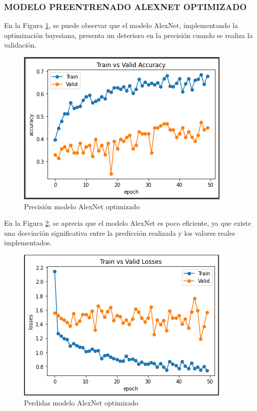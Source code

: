 	\subsubsection{\MakeUppercase{Modelo preentrenado AlexNet optimizado}}
	En la Figura \ref{fig:preci_Alex_OPT}, se puede observar que el modelo AlexNet, implementando la optimización bayesiana, presenta un deterioro en la precisión cuando se realiza la validación.
		\begin{figure}[ht]
			\centering
			\includegraphics[scale=0.6]{Figs/500.png}
			\caption{Precisión modelo AlexNet optimizado}
			\label{fig:preci_Alex_OPT}
		\end{figure}
	
	En la Figura \ref{fig:perdda_Alex_opt}, se aprecia que el modelo AlexNet es poco eficiente, ya que existe una desviación significativa entre la predicción realizada y los valores reales implementados.
		\begin{figure}[ht]
			\centering
			\includegraphics[scale=0.6]{Figs/501.png}
			\caption{Perdidas modelo AlexNet optimizado}
			\label{fig:perdda_Alex_opt}
		\end{figure}
	
